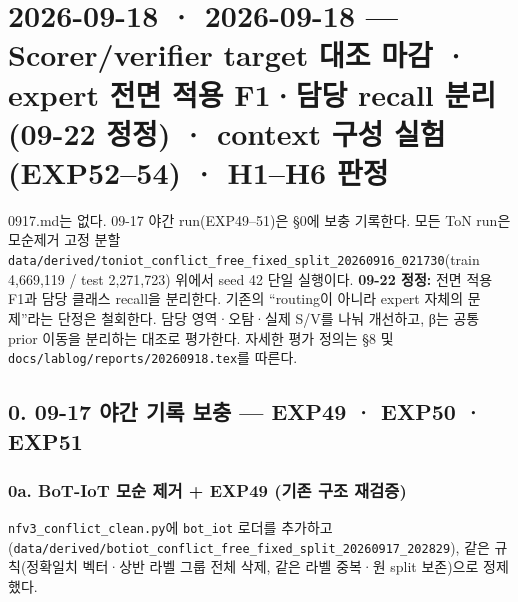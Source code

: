 \section{2026-09-18 · 2026-09-18 — Scorer/\allowbreak{}verifier target 대조 마감 · expert 전면 적용 F1·담당 recall 분리(09-22 정정) · context 구성 실험(EXP52–54) · H1–H6 판정}
\label{report:20260918_0918}
0917.md는 없다. 09-17 야간 run(EXP49–51)은 §0에 보충 기록한다. 모든 ToN run은 모순제거 고정 분할 \texttt{data/\allowbreak{}\allowbreak{}der\allowbreak{}ived/\allowbreak{}\allowbreak{}ton\allowbreak{}iot\_\allowbreak{}\allowbreak{}conf\allowbreak{}lict\_\allowbreak{}\allowbreak{}fre\allowbreak{}e\_\allowbreak{}\allowbreak{}fixed\_\allowbreak{}\allowbreak{}split\_\allowbreak{}\allowbreak{}20\allowbreak{}260916\_\allowbreak{}\allowbreak{}0\allowbreak{}21730}(train 4,669,119 /\allowbreak{} test 2,271,723) 위에서 seed 42 단일 실행이다. \textbf{09-22 정정:} 전면 적용 F1과 담당 클래스 recall을 분리한다. 기존의 “routing이 아니라 expert 자체의 문제”라는 단정은 철회한다. 담당 영역·오탐·실제 S/\allowbreak{}V를 나눠 개선하고, β는 공통 prior 이동을 분리하는 대조로 평가한다. 자세한 평가 정의는 §8 및 \texttt{docs/\allowbreak{}\allowbreak{}lab\allowbreak{}log/\allowbreak{}\allowbreak{}repo\allowbreak{}rts/\allowbreak{}\allowbreak{}2026\allowbreak{}0918.\allowbreak{}tex\allowbreak{}}를 따른다.



\subsection{0. 09-17 야간 기록 보충 — EXP49 · EXP50 · EXP51}
\subsubsection{0a. BoT-IoT 모순 제거 +\allowbreak{} EXP49 (기존 구조 재검증)}
\texttt{nfv3\_\allowbreak{}\allowbreak{}con\allowbreak{}flict\_\allowbreak{}\allowbreak{}cl\allowbreak{}ean.\allowbreak{}py}에 \texttt{bot\_\allowbreak{}\allowbreak{}iot} 로더를 추가하고(\texttt{data/\allowbreak{}\allowbreak{}der\allowbreak{}ived/\allowbreak{}\allowbreak{}bot\allowbreak{}iot\_\allowbreak{}\allowbreak{}conf\allowbreak{}lict\_\allowbreak{}\allowbreak{}fre\allowbreak{}e\_\allowbreak{}\allowbreak{}fixed\_\allowbreak{}\allowbreak{}split\_\allowbreak{}\allowbreak{}20\allowbreak{}260917\_\allowbreak{}\allowbreak{}2\allowbreak{}02829}), 같은 규칙(정확일치 벡터·상반 라벨 그룹 전체 삭제, 같은 라벨 중복·원 split 보존)으로 정제했다.

